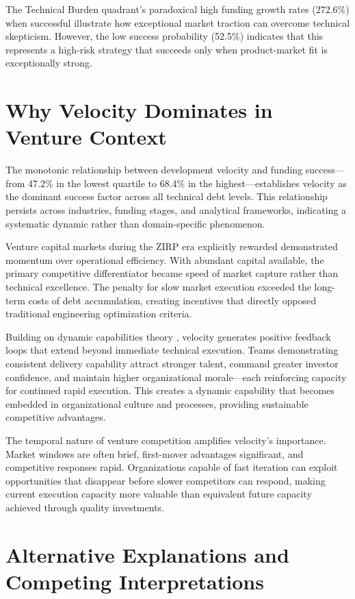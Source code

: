 The Technical Burden quadrant's paradoxical high funding growth rates (272.6\%) when successful illustrate how exceptional market traction can overcome technical skepticism. However, the low success probability (52.5\%) indicates that this represents a high-risk strategy that succeeds only when product-market fit is exceptionally strong.

\section{Why Velocity Dominates in Venture Context}

The monotonic relationship between development velocity and funding success—from 47.2\% in the lowest quartile to 68.4\% in the highest—establishes velocity as the dominant success factor across all technical debt levels. This relationship persists across industries, funding stages, and analytical frameworks, indicating a systematic dynamic rather than domain-specific phenomenon.

Venture capital markets during the \ac{ZIRP} era explicitly rewarded demonstrated momentum over operational efficiency. With abundant capital available, the primary competitive differentiator became speed of market capture rather than technical excellence. The penalty for slow market execution exceeded the long-term costs of debt accumulation, creating incentives that directly opposed traditional engineering optimization criteria.

Building on dynamic capabilities theory \citep{teece1997dynamic}, velocity generates positive feedback loops that extend beyond immediate technical execution. Teams demonstrating consistent delivery capability attract stronger talent, command greater investor confidence, and maintain higher organizational morale—each reinforcing capacity for continued rapid execution. This creates a dynamic capability that becomes embedded in organizational culture and processes, providing sustainable competitive advantages.

The temporal nature of venture competition amplifies velocity's importance. Market windows are often brief, first-mover advantages significant, and competitive responses rapid. Organizations capable of fast iteration can exploit opportunities that disappear before slower competitors can respond, making current execution capacity more valuable than equivalent future capacity achieved through quality investments.

\section{Alternative Explanations and Competing Interpretations}

